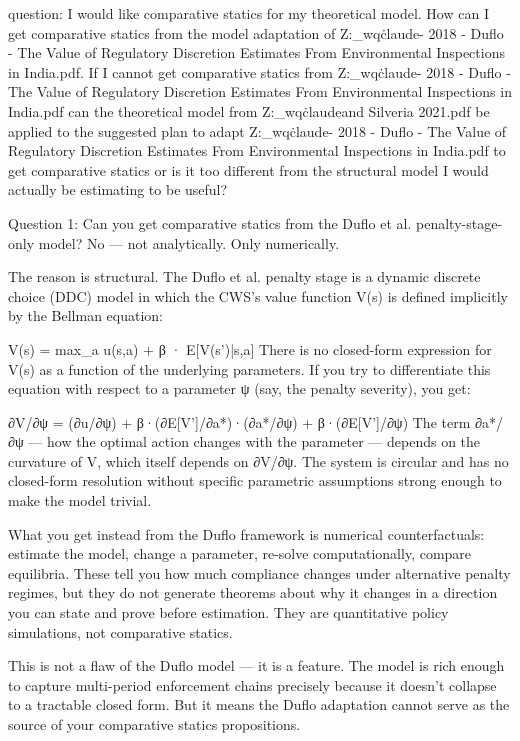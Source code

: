 question: I would like comparative statics for my theoretical model. How can I get comparative statics from the model adaptation of Z:\mining_wq\.claude\skills\Econometrica - 2018 - Duflo - The Value of Regulatory Discretion  Estimates From Environmental Inspections in India.pdf. If I cannot get comparative statics from Z:\mining_wq\.claude\skills\Econometrica - 2018 - Duflo - The Value of Regulatory Discretion  Estimates From Environmental Inspections in India.pdf can the theoretical model from Z:\mining_wq\.claude\skills\Kang and Silveria 2021.pdf be applied to the suggested plan to adapt Z:\mining_wq\.claude\skills\Econometrica - 2018 - Duflo - The Value of Regulatory Discretion  Estimates From Environmental Inspections in India.pdf to get comparative statics or is it too different from the structural model I would actually be estimating to be useful?

Question 1: Can you get comparative statics from the Duflo et al. penalty-stage-only model?
No — not analytically. Only numerically.

The reason is structural. The Duflo et al. penalty stage is a dynamic discrete choice (DDC) model in which the CWS's value function V(s) is defined implicitly by the Bellman equation:


V(s) = max_a { u(s,a) + β · E[V(s')|s,a] }
There is no closed-form expression for V(s) as a function of the underlying parameters. If you try to differentiate this equation with respect to a parameter ψ (say, the penalty severity), you get:


∂V/∂ψ = (∂u/∂ψ) + β·(∂E[V']/∂a*)·(∂a*/∂ψ) + β·(∂E[V']/∂ψ)
The term ∂a*/∂ψ — how the optimal action changes with the parameter — depends on the curvature of V, which itself depends on ∂V/∂ψ. The system is circular and has no closed-form resolution without specific parametric assumptions strong enough to make the model trivial.

What you get instead from the Duflo framework is numerical counterfactuals: estimate the model, change a parameter, re-solve computationally, compare equilibria. These tell you how much compliance changes under alternative penalty regimes, but they do not generate theorems about why it changes in a direction you can state and prove before estimation. They are quantitative policy simulations, not comparative statics.

This is not a flaw of the Duflo model — it is a feature. The model is rich enough to capture multi-period enforcement chains precisely because it doesn't collapse to a tractable closed form. But it means the Duflo adaptation cannot serve as the source of your comparative statics propositions.

